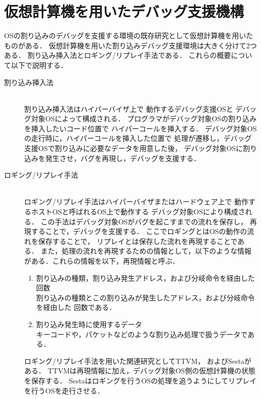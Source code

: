 \documentclass[tanilab-enum]{graduate}
\begin{document}
\section{仮想計算機を用いたデバッグ支援機構}
OSの割り込みのデバッグを支援する環境の既存研究として仮想計算機を用いたものがある．
仮想計算機を用いた割り込みデバッグ支援環境は大きく分けて2つある．
割り込み挿入法\cite{miyahara}とロギング/リプレイ手法である．
これらの概要について以下で説明する．
\begin{description}
    \item[割り込み挿入法]\mbox{}\\
        割り込み挿入法はハイパーバイザ上で
        動作するデバッグ支援OSと
        デバッグ対象OSによって構成される．
        プログラマがデバッグ対象OSの割り込みを挿入したいコード位置で
        ハイパーコールを挿入する．
        デバッグ対象OSの走行時に，ハイパーコールを挿入した位置で
        処理が遷移し，デバッグ支援OSで割り込みに必要なデータを用意した後，
        デバッグ対象OSに割り込みを発生させ，バグを再現し，デバッグを支援する．
    \item[ロギング/リプレイ手法]\mbox{}\\
        ロギング/リプレイ手法はハイパーバイザまたはハードウェア上で
        動作するホストOSと呼ばれるOS上で動作する
        デバッグ対象OSにより構成される．
        この手法はデバッグ対象OSがバグを起こすまでの流れを保存し，
        再現することで，デバッグを支援する．
        ここでロギングとはOSの動作の流れを保存することで，
        リプレイとは保存した流れを再現することである．
        また，処理の流れを再現するための情報として，以下のような情報
        がある．これらの情報を以下，再現情報と呼ぶ．
        \begin{enumerate}
            \item 割り込みの種類，割り込み発生アドレス，および分岐命令を経由した回数\\
                割り込みの種類とこの割り込みが発生したアドレス，および分岐命令を経由した
                回数である．
            \item 割り込み発生時に使用するデータ\\
                キーコードや，パケットなどのような割り込み処理で扱うデータである．
        \end{enumerate}
        ロギング/リプレイ手法を用いた関連研究としてTTVM\cite{samuel}，
        およびSesta\cite{kawasaki}がある．
        TTVMは再現情報に加え，デバッグ対象OS側の仮想計算機の状態を保存する．
        Sestaはロギングを行うOSの処理を追うようにしてリプレイを行うOSを走行させる．

\end{description}
\end{document}
